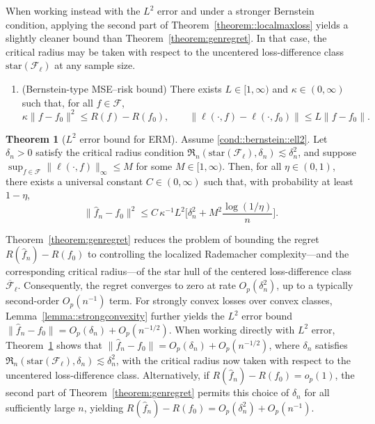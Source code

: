 \documentclass[11pt]{article}
\theoremstyle{plain}
\theoremstyle{definition} %
\newtheorem{theorem}{Theorem}
\begin{document}
 
When working instead with the \(L^2\) error and under a stronger Bernstein condition, applying the second part of Theorem~\ref{theorem::localmaxloss} yields a slightly cleaner bound than Theorem~\ref{theorem:genregret}. In that case, the critical radius may be taken with respect to the uncentered loss-difference class \(\mathrm{star}(\mathcal F_{\ell})\) at any sample size.


\begin{enumerate}[label=\bf{A\arabic*)}, ref={A\arabic*}, resume = main]
  \item \label{cond::bernstein::ell2} (Bernstein-type MSE--risk bound) There exists $L\in [1,\infty)$ and $\kappa \in (0,\infty)$ such that, for all $f\in\mathcal F$,
\begin{equation*}
\kappa \|f - f_0\|^2 \leq R(f) - R(f_0), \qquad \|\ell(\cdot,f)-\ell(\cdot,f_0)\| \le L \|f- f_0\|.
\end{equation*}
\end{enumerate}


\begin{theorem}[$L^2$ error bound for ERM]
\label{theorem:genregret::ell2}
Assume \ref{cond::bernstein::ell2}. Let \(\delta_n>0\) satisfy the critical radius condition
\(\mathfrak{R}_n(\mathrm{star}(\mathcal{F}_{\ell}),\delta_n)\lesssim \delta_n^2\), and suppose
\(\sup_{f \in \mathcal{F}} \|\ell(\cdot, f)\|_{\infty} \leq M\) for some \(M \in [1, \infty)\).
Then, for all \(\eta \in (0, 1)\), there exists a universal constant
\(C\in(0,\infty)\) such that, with probability at least \(1-\eta\),
\[
 \|\hat f_n - f_0\|^2 
\le
C\,\kappa^{-1} L^2 \Biggl[
\delta_n^2
+
M^2 \frac{\log(1/\eta)}{n}
\Biggr].
\]
\end{theorem}

 
Theorem~\ref{theorem:genregret} reduces the problem of bounding the regret \(R(\hat f_n)-R(f_0)\) to controlling the localized Rademacher complexity—and the corresponding critical radius—of the star hull of the centered loss-difference class \(\overline{\mathcal F}_{\ell}\). Consequently, the regret converges to zero at rate \(O_p(\delta_n^2)\), up to a typically second-order \(O_p(n^{-1})\) term. For strongly convex losses over convex classes, Lemma~\ref{lemma::strongconvexity} further yields the \(L^2\) error bound \(\|\hat f_n-f_0\|=O_p(\delta_n)+O_p(n^{-1/2})\). When working directly with \(L^2\) error, Theorem~\ref{theorem:genregret::ell2} shows that \(\|\hat f_n-f_0\|=O_p(\delta_n)+O_p(n^{-1/2})\), where \(\delta_n\) satisfies \(\mathfrak{R}_n(\mathrm{star}(\mathcal F_{\ell}),\delta_n)\lesssim \delta_n^2\), with the critical radius now taken with respect to the uncentered loss-difference class. Alternatively, if \(R(\hat f_n)-R(f_0)=o_p(1)\), the second part of Theorem~\ref{theorem:genregret} permits this choice of \(\delta_n\) for all sufficiently large \(n\), yielding \(R(\hat f_n)-R(f_0)=O_p(\delta_n^2)+O_p(n^{-1})\).
\end{document}
